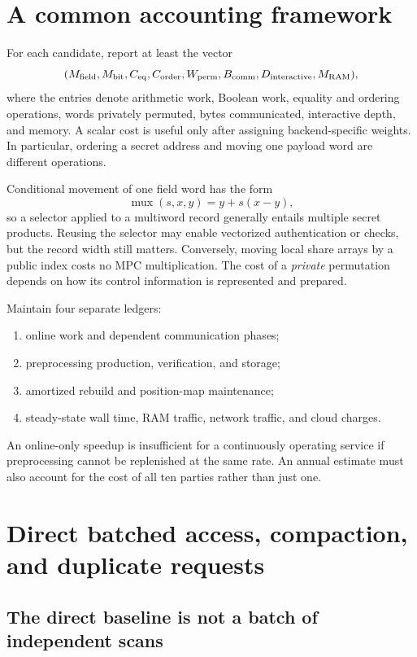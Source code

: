\documentclass[11pt]{article}
\begin{document}
\section{A common accounting framework}\label{sec:accounting}

For each candidate, report at least the vector
\[
(M_{\rm field},M_{\rm bit},C_{\rm eq},C_{\rm order},
 W_{\rm perm},B_{\rm comm},D_{\rm interactive},M_{\rm RAM}),
\]
where the entries denote arithmetic work, Boolean work, equality and ordering
operations, words privately permuted, bytes communicated, interactive depth,
and memory. A scalar cost is useful only after assigning backend-specific
weights. In particular, ordering a secret address and moving one payload word
are different operations.

Conditional movement of one field word has the form
\[
\operatorname{mux}(s,x,y)=y+s(x-y),
\]
so a selector applied to a multiword record generally entails multiple secret
products. Reusing the selector may enable vectorized authentication or checks,
but the record width still matters. Conversely, moving local share arrays by a
public index costs no MPC multiplication. The cost of a \emph{private}
permutation depends on how its control information is represented and prepared.

Maintain four separate ledgers:
\begin{enumerate}
\item online work and dependent communication phases;
\item preprocessing production, verification, and storage;
\item amortized rebuild and position-map maintenance;
\item steady-state wall time, RAM traffic, network traffic, and cloud charges.
\end{enumerate}
An online-only speedup is insufficient for a continuously operating service if
preprocessing cannot be replenished at the same rate. An annual estimate must
also account for the cost of all ten parties rather than just one.

\section{Direct batched access, compaction, and duplicate requests}\label{sec:batch}

\subsection{The direct baseline is not a batch of independent scans}
\end{document}
